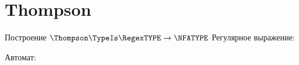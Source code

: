 \section{Thompson}
\begin{frame}{Построение $\Thompson\TypeIs\RegexTYPE\to\NFATYPE$}
	Регулярное выражение:

	Автомат:


\end{frame}
